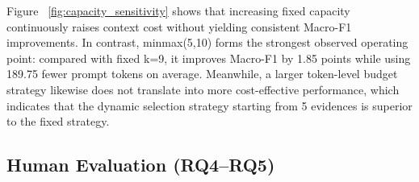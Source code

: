 \documentclass[letterpaper]{article}
\begin{document}

Figure ~\ref{fig:capacity_sensitivity} shows that increasing fixed capacity continuously raises context cost without yielding consistent Macro-F1 improvements. In contrast, minmax(5,10) forms the strongest observed operating point: compared with fixed k=9, it improves Macro-F1 by 1.85 points while using 189.75 fewer prompt tokens on average. Meanwhile, a larger token-level budget strategy likewise does not translate into more cost-effective performance, which indicates that the dynamic selection strategy starting from 5 evidences is superior to the fixed strategy.

\subsection{Human Evaluation (RQ4--RQ5)}
\label{sec:human-audit}
\end{document}

